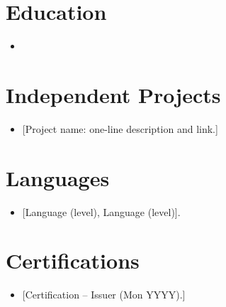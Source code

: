 \documentclass[11pt,a4paper,sans]{moderncv}
\begin{document}

\section{Education}
\vspace{1pt}
\begin{itemize}

\item{}

\end{itemize}


\section{Independent Projects}
\vspace{1pt}
\begin{itemize}

\item {[Project name: one-line description and link.]}

\end{itemize}


\section{Languages}
\vspace{1pt}
\begin{itemize}
\item {[Language (level), Language (level)].}
\end{itemize}


\section{Certifications}
\vspace{1pt}
\begin{itemize}
\item {[Certification -- Issuer (Mon YYYY).]}
\end{itemize}
\end{document}
